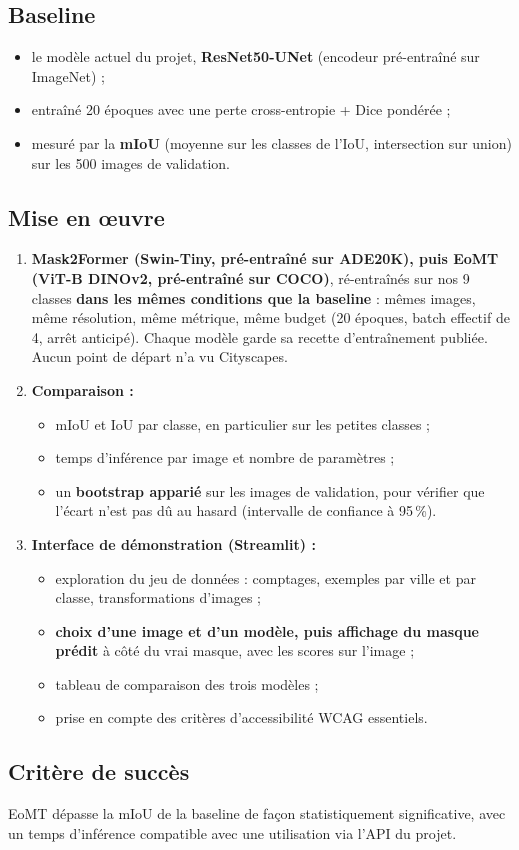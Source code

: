 \documentclass[11pt,a4paper]{article}
\begin{document}
\subsection*{Baseline}

\begin{itemize}
  \item le modèle actuel du projet, \textbf{ResNet50-UNet} (encodeur
        pré-entraîné sur ImageNet) ;
  \item entraîné 20 époques avec une perte cross-entropie + Dice pondérée ;
  \item mesuré par la \textbf{mIoU} (moyenne sur les classes de l'IoU,
        intersection sur union) sur les 500 images de validation.
\end{itemize}

\subsection*{Mise en œuvre}

\begin{enumerate}
  \item \textbf{Mask2Former (Swin-Tiny, pré-entraîné sur ADE20K), puis EoMT
        (ViT-B DINOv2, pré-entraîné sur COCO)}, ré-entraînés sur nos 9 classes
        \textbf{dans les mêmes conditions que la baseline} : mêmes images, même
        résolution, même métrique, même budget (20 époques, batch effectif
        de 4, arrêt anticipé). Chaque modèle garde sa recette d'entraînement
        publiée. Aucun point de départ n'a vu Cityscapes.
  \item \textbf{Comparaison :}
        \begin{itemize}
          \item mIoU et IoU par classe, en particulier sur les petites classes ;
          \item temps d'inférence par image et nombre de paramètres ;
          \item un \textbf{bootstrap apparié} sur les images de validation,
                pour vérifier que l'écart n'est pas dû au hasard (intervalle de
                confiance à 95\,\%).
        \end{itemize}
  \item \textbf{Interface de démonstration (Streamlit) :}
        \begin{itemize}
          \item exploration du jeu de données : comptages, exemples par ville
                et par classe, transformations d'images ;
          \item \textbf{choix d'une image et d'un modèle, puis affichage du
                masque prédit} à côté du vrai masque, avec les scores sur
                l'image ;
          \item tableau de comparaison des trois modèles ;
          \item prise en compte des critères d'accessibilité WCAG essentiels.
        \end{itemize}
\end{enumerate}

\subsection*{Critère de succès}

EoMT dépasse la mIoU de la baseline de façon statistiquement significative,
avec un temps d'inférence compatible avec une utilisation via l'API du projet.
\end{document}
